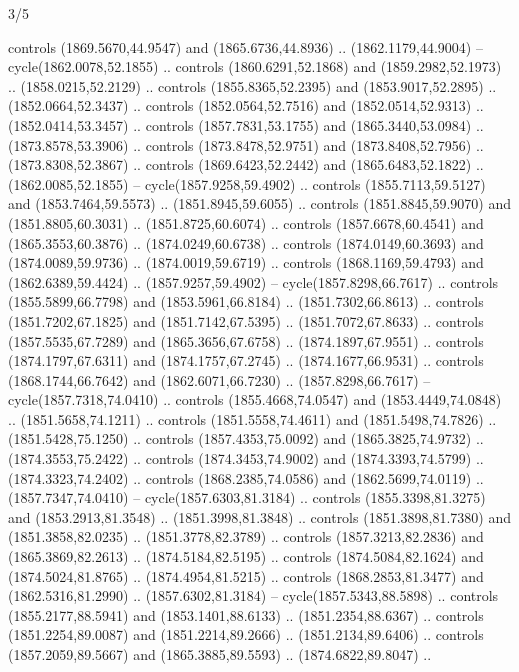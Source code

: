 \begin{flagdescription}{3/5}
\begin{scope}[xshift=0.5\flaglength,yshift=0.5\flagwidth,scale=\flagwidth/99]
\begin{scope}[y=0.8pt, x=0.8pt, yscale=-0.20628, xscale=0.20628,shift={(-500,-300)}]
\begin{scope}[cm={{0.79646,0.0,0.0,0.7753,(100.0721,273.79617)}}]
\begin{scope}[cm={{1.1028,0.0,0.0,1.08434,(-41.46868,-11.26981)}}]
  controls (1869.5670,44.9547) and (1865.6736,44.8936) .. (1862.1179,44.9004) --
  cycle(1862.0078,52.1855) .. controls (1860.6291,52.1868) and
  (1859.2982,52.1973) .. (1858.0215,52.2129) .. controls (1855.8365,52.2395) and
  (1853.9017,52.2895) .. (1852.0664,52.3437) .. controls (1852.0564,52.7516) and
  (1852.0514,52.9313) .. (1852.0414,53.3457) .. controls (1857.7831,53.1755) and
  (1865.3440,53.0984) .. (1873.8578,53.3906) .. controls (1873.8478,52.9751) and
  (1873.8408,52.7956) .. (1873.8308,52.3867) .. controls (1869.6423,52.2442) and
  (1865.6483,52.1822) .. (1862.0085,52.1855) -- cycle(1857.9258,59.4902) ..
  controls (1855.7113,59.5127) and (1853.7464,59.5573) .. (1851.8945,59.6055) ..
  controls (1851.8845,59.9070) and (1851.8805,60.3031) .. (1851.8725,60.6074) ..
  controls (1857.6678,60.4541) and (1865.3553,60.3876) .. (1874.0249,60.6738) ..
  controls (1874.0149,60.3693) and (1874.0089,59.9736) .. (1874.0019,59.6719) ..
  controls (1868.1169,59.4793) and (1862.6389,59.4424) .. (1857.9257,59.4902) --
  cycle(1857.8298,66.7617) .. controls (1855.5899,66.7798) and
  (1853.5961,66.8184) .. (1851.7302,66.8613) .. controls (1851.7202,67.1825) and
  (1851.7142,67.5395) .. (1851.7072,67.8633) .. controls (1857.5535,67.7289) and
  (1865.3656,67.6758) .. (1874.1897,67.9551) .. controls (1874.1797,67.6311) and
  (1874.1757,67.2745) .. (1874.1677,66.9531) .. controls (1868.1744,66.7642) and
  (1862.6071,66.7230) .. (1857.8298,66.7617) -- cycle(1857.7318,74.0410) ..
  controls (1855.4668,74.0547) and (1853.4449,74.0848) .. (1851.5658,74.1211) ..
  controls (1851.5558,74.4611) and (1851.5498,74.7826) .. (1851.5428,75.1250) ..
  controls (1857.4353,75.0092) and (1865.3825,74.9732) .. (1874.3553,75.2422) ..
  controls (1874.3453,74.9002) and (1874.3393,74.5799) .. (1874.3323,74.2402) ..
  controls (1868.2385,74.0586) and (1862.5699,74.0119) .. (1857.7347,74.0410) --
  cycle(1857.6303,81.3184) .. controls (1855.3398,81.3275) and
  (1853.2913,81.3548) .. (1851.3998,81.3848) .. controls (1851.3898,81.7380) and
  (1851.3858,82.0235) .. (1851.3778,82.3789) .. controls (1857.3213,82.2836) and
  (1865.3869,82.2613) .. (1874.5184,82.5195) .. controls (1874.5084,82.1624) and
  (1874.5024,81.8765) .. (1874.4954,81.5215) .. controls (1868.2853,81.3477) and
  (1862.5316,81.2990) .. (1857.6302,81.3184) -- cycle(1857.5343,88.5898) ..
  controls (1855.2177,88.5941) and (1853.1401,88.6133) .. (1851.2354,88.6367) ..
  controls (1851.2254,89.0087) and (1851.2214,89.2666) .. (1851.2134,89.6406) ..
  controls (1857.2059,89.5667) and (1865.3885,89.5593) .. (1874.6822,89.8047) ..

\end{scope}
\end{scope}
\end{scope}
\end{scope}
\end{flagdescription}
